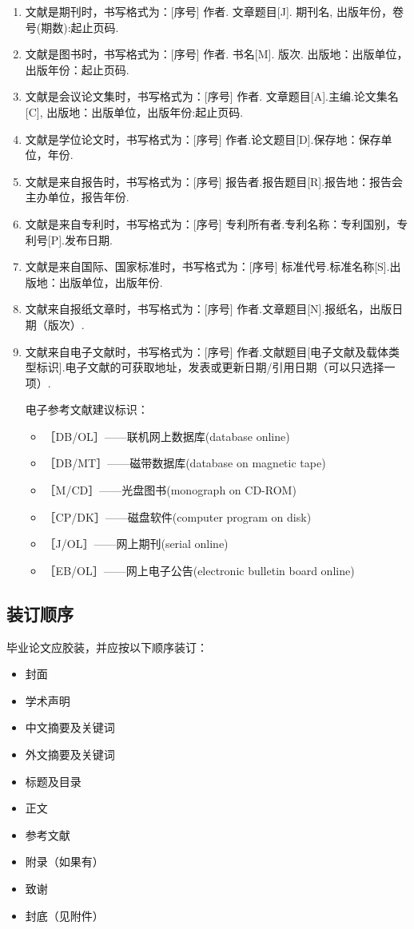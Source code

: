 \begin{enumerate}
    \item 文献是期刊时，书写格式为：[序号] 作者. 文章题目[J]. 期刊名, 出版年份，卷号(期数):起止页码.
    \item 文献是图书时，书写格式为：[序号] 作者. 书名[M]. 版次. 出版地：出版单位，出版年份：起止页码.
    \item 文献是会议论文集时，书写格式为：[序号] 作者. 文章题目[A].主编.论文集名[C], 出版地：出版单位，出版年份:起止页码.
    \item 文献是学位论文时，书写格式为：[序号] 作者.论文题目[D].保存地：保存单位，年份.
    \item 文献是来自报告时，书写格式为：[序号] 报告者.报告题目[R].报告地：报告会主办单位，报告年份.
    \item 文献是来自专利时，书写格式为：[序号] 专利所有者.专利名称：专利国别，专利号[P].发布日期.
    \item 文献是来自国际、国家标准时，书写格式为：[序号] 标准代号.标准名称[S].出版地：出版单位，出版年份.
    \item 文献来自报纸文章时，书写格式为：[序号] 作者.文章题目[N].报纸名，出版日期（版次）.
    \item 文献来自电子文献时，书写格式为：[序号] 作者.文献题目[电子文献及载体类型标识].电子文献的可获取地址，发表或更新日期/引用日期（可以只选择一项）.
    
    电子参考文献建议标识：
    \begin{itemize}
        \item ［DB/OL］——联机网上数据库(database online)
        \item ［DB/MT］——磁带数据库(database on magnetic tape)
        \item ［M/CD］——光盘图书(monograph on CD-ROM)
        \item ［CP/DK］——磁盘软件(computer program on disk)
        \item ［J/OL］——网上期刊(serial online)
        \item ［EB/OL］——网上电子公告(electronic bulletin board online)
    \end{itemize}
\end{enumerate}



\subsection{装订顺序}
毕业论文应胶装，并应按以下顺序装订：

\begin{itemize}
    \item 封面
    \item 学术声明
    \item 中文摘要及关键词
    \item 外文摘要及关键词
    \item 标题及目录
    \item 正文
    \item 参考文献
    \item 附录（如果有）
    \item 致谢
    \item 封底（见附件）
\end{itemize}